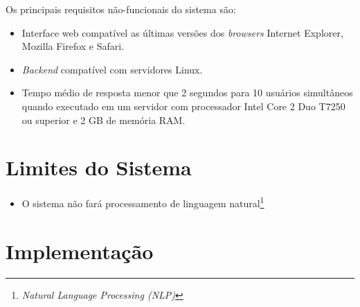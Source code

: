 Os principais requisitos não-funcionais do sistema são:

\begin{itemize}

    \item Interface web compatível as últimas versões dos \textit{browsers} Internet Explorer, Mozilla Firefox e Safari.
    
    \item \textit{Backend} compatível com servidores Linux.

    \item Tempo médio de resposta menor que 2 segundos para 10 usuários simultâneos quando executado em um servidor com processador Intel Core 2 Duo T7250 ou superior e 2 GB de memória RAM. %

\end{itemize}

\section{Limites do Sistema}

\begin{itemize}
  
    \item O sistema não fará processamento de linguagem natural\footnote{\textit{Natural Language Processing (NLP)}}

\end{itemize}

\section{Implementação} %
\label{sec:implementacao}



